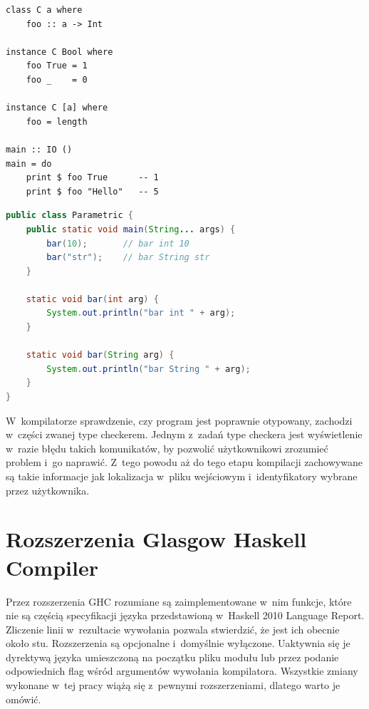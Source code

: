 \begin{lstlisting}[float,label={lst:poly_adhoc},
                   caption={Przykład użycia polimorfizmu ad hoc w Haskellu.}]
class C a where
    foo :: a -> Int

instance C Bool where
    foo True = 1
    foo _    = 0

instance C [a] where
    foo = length

main :: IO ()
main = do
    print $ foo True      -- 1
    print $ foo "Hello"   -- 5
\end{lstlisting}

\begin{lstlisting}[float,language=Java,label={lst:poly_adhoc_java},
                   caption={Przykład użycia polimorfizmu ad hoc w Javie.}]
public class Parametric {
    public static void main(String... args) {
        bar(10);       // bar int 10
        bar("str");    // bar String str
    }

    static void bar(int arg) {
        System.out.println("bar int " + arg);
    }

    static void bar(String arg) {
        System.out.println("bar String " + arg);
    }
}
\end{lstlisting}

W~kompilatorze sprawdzenie, czy program jest poprawnie otypowany, zachodzi w~części
zwanej type checkerem. Jednym z~zadań type checkera jest wyświetlenie w~razie błędu takich
komunikatów, by pozwolić użytkownikowi zrozumieć problem i~go naprawić.
Z~tego powodu aż do tego etapu kompilacji zachowywane są takie informacje
jak lokalizacja w~pliku wejściowym i~identyfikatory wybrane przez użytkownika.

\section{Rozszerzenia Glasgow Haskell Compiler}\label{sec:rozszerzenia_ghc}

Przez rozszerzenia GHC rozumiane są zaimplementowane w~nim funkcje, które nie są
częścią specyfikacji języka przedstawioną w~Haskell 2010 Language
Report. Zliczenie linii w~rezultacie wywołania 
pozwala stwierdzić, że jest ich obecnie około stu. Rozszerzenia są opcjonalne
i~domyślnie wyłączone. Uaktywnia się je dyrektywą języka umieszczoną na początku
pliku modułu lub przez podanie odpowiednich flag wśród argumentów wywołania
kompilatora. Wszystkie zmiany wykonane w~tej pracy wiążą się z~pewnymi
rozszerzeniami, dlatego warto je omówić.

